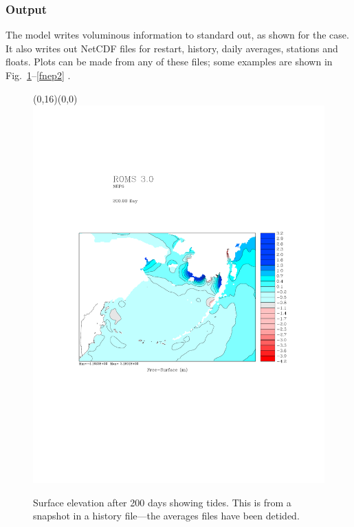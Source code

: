\subsubsection{Output}
The model writes voluminous information to standard out, as shown
for the  case.
It also writes out NetCDF files for restart, history, daily
averages, stations and floats.  Plots can be made from any of
these files; some examples are shown in Fig.\
\ref{fnep1}--\ref{fnep2} .

\begin{figure}
\setlength{\unitlength}{10mm}
\begin{picture}(0,16)(0,0)
\includegraphics{pics/zeta_NEP5}
  \end{picture}
\caption{Surface elevation after 200 days showing tides. This is
from a snapshot in a history file---the averages files have been
detided.}
\label{fnep1}
\end{figure}

